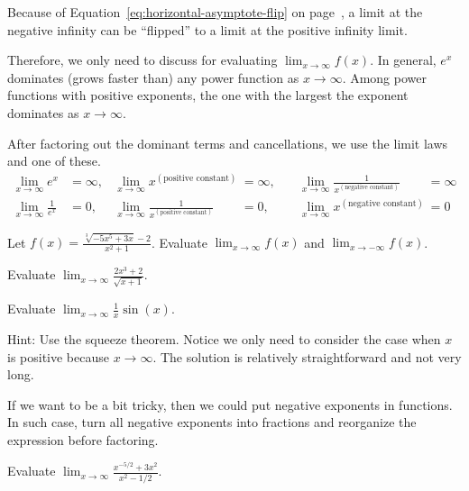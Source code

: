 \documentclass[../main.tex]{subfiles}
\begin{document}
Because of Equation~\eqref{eq:horizontal-asymptote-flip} on page~\pageref{eq:horizontal-asymptote-flip}, a limit at the negative infinity can be ``flipped'' to a limit at the positive infinity limit. 

Therefore, we only need to discuss  for evaluating \(\lim_{x \to \infty} f(x)\). In general, \(e^{x}\) dominates (grows faster than) any power function as \(x \to \infty\). Among power functions with positive exponents, the one with the largest the exponent dominates as \(x \to \infty\).

After factoring out the dominant terms and cancellations, we use the limit laws and one of these.
\begin{align*}
  \lim_{x \to \infty} e^{x} &= \infty, & \lim_{x \to \infty} x^{(\text{positive constant})} &= \infty, & \quad \lim_{x \to \infty} \frac{1}{x^{(\text{negative constant})}} &= \infty \\
  \lim_{x \to \infty} \frac{1}{e^{x}} &= 0, & \lim_{x \to \infty} \frac{1}{x^{(\text{positive constant})}} &= 0, & \quad \lim_{x \to \infty} x^{(\text{negative constant})} &= 0
\end{align*}

\begin{example}
  Let \(f(x) = \frac{\sqrt[3]{-5x^{5} + 3x} - 2}{x^{2} + 1}\). 
  Evaluate \(\lim_{x \to \infty} f(x)\) and \(\lim_{x \to -\infty} f(x)\). 

\end{example}

\begin{example}
  Evaluate \(\lim_{x \to \infty} \frac{2x^{3} + 2}{\sqrt{x + 1}}\).

\end{example}
\clearpage

\begin{example}
  Evaluate \(\lim_{x \to \infty} \frac{1}{x} \sin(x)\).

  {\scriptsize Hint: Use the squeeze theorem. Notice we only need to consider the case when \(x\) is positive because \(x \to \infty\). The solution is relatively straightforward and not very long.}

\end{example}

If we want to be a bit tricky, then we could put negative exponents in functions.  In such case, turn all negative exponents into fractions and reorganize the expression before factoring.
\begin{example}
  Evaluate \(\lim_{x \to \infty} \frac{x^{-5/2} + 3x^{2}}{x^{2} - 1/2}\). 
\end{example}
\end{document}
